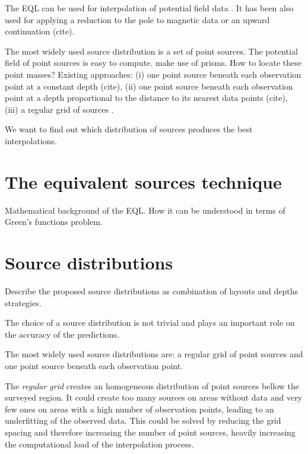 \documentclass[twocolumn]{article}
\begin{document}
The EQL can be used for interpolation of potential field data \citep{cordell1992,
cooper2000}.
It has been also used for applying a reduction to the pole to magnetic data
\citep{guspi2009, silva1986, emilia1973, nakatsuka2006} or an upward continuation
(cite).

The most widely used source distribution is a set of point sources.
The potential field of point sources is easy to compute.
\citet{barnes2011} make use of prisms.
How to locate these point masses?
Existing approaches:
(i) one point source beneath each observation point at a constant depth (cite),
(ii) one point source beneath each observation point at a depth proportional to the
distance to its nearest data points (cite),
(iii) a regular grid of sources \citep{barnes2011}.

We want to find out which distribution of sources produces the best interpolations.



\section{The equivalent sources technique}

Mathematical background of the EQL\@.
How it can be understood in terms of Green's functions problem.



\section{Source distributions}

Describe the proposed source distributions as combination of layouts and depths
strategies.

The choice of a source distribution is not trivial and plays an important role on the
accuracy of the predictions.

The most widely used source distributions are: a regular grid of point sources and
one point source beneath each observation point.

The \emph{regular grid} creates an homogeneous distribution of point sources bellow the
surveyed region.
It could create too many sources on areas without data and very few ones on
areas with a high number of observation points, leading to an underfitting of the
observed data.
This could be solved by reducing the grid spacing and therefore increasing the number of
point sources, heavily increasing the computational load of the interpolation process.
\end{document}
